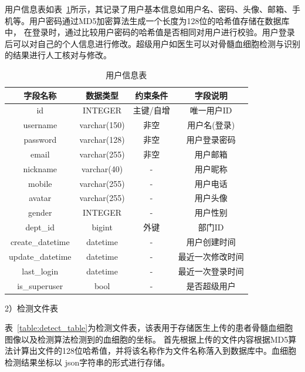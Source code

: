 用户信息表如表~\ref{table:user_table}所示，其记录了用户基本信息如用户名、密码、头像、邮箱、手机等。用户密码通过MD5加密算法生成一个长度为128位的哈希值存储在数据库中，
在登录时，通过比较用户密码的哈希值是否相同对用户进行校验。用户登录后可以对自己的个人信息进行修改。超级用户如医生可以对骨髓血细胞检测与识别的结果进行人工核对与修改。
\begin{table}
    \caption{用户信息表}   
    \centering 
    \label{table:user_table}
    \begin{tabular*}{0.9\hsize}{@{}@{\extracolsep{\fill}}cccc@{}}
      \toprule[1pt]
      字段名称  &  数据类型 & 约束条件 & 字段说明 \\
      \midrule[1pt] 
      id & INTEGER & 主键/自增 & 唯一用户ID   \\ 
      username & varchar(150) & 非空 & 用户名(登录)   \\ 
      password & varchar(128) & 非空 & 用户登录密码   \\ 
      email    & varchar(255) & 非空 & 用户邮箱 \\
      nickname & varchar(40)  &  -   & 用户昵称  \\ 
      mobile   & varchar(255) &  -   & 用户电话  \\
      avatar   & varchar(255) &  -   & 用户头像  \\
      gender   & INTEGER      &  -   & 用户性别   \\
      dept\_id  & bigint       &  外键   &  部门ID  \\ 
      create\_datetime & datetime & -    & 用户创建时间 \\
      update\_datetime & datetime & -    & 最近一次修改时间 \\
      last\_login & datetime & -           & 最近一次登录时间 \\
      is\_superuser & bool   &  -         & 是否超级用户 \\
      \bottomrule[1pt]      
    \end{tabular*} 
  \end{table}

2）检测文件表

表~\ref{table:detect_table}为检测文件表，该表用于存储医生上传的患者骨髓血细胞图像以及检测算法检测到的血细胞的坐标。
首先根据上传的文件内容根据MD5算法计算出文件的128位哈希值，并将该名称作为文件名称落入到数据库中。血细胞检测结果坐标以
json字符串的形式进行存储。

